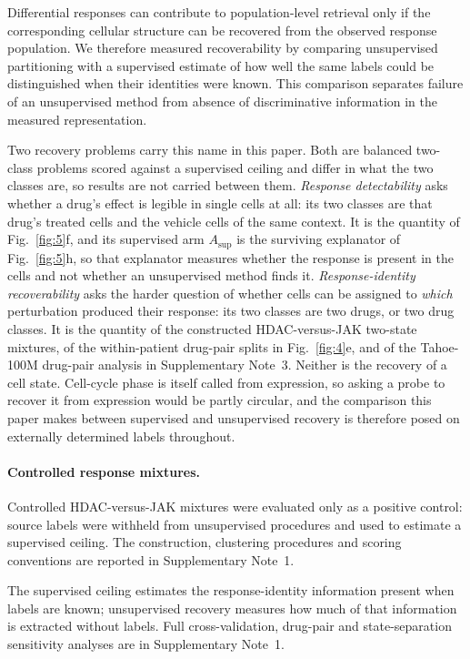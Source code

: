 \documentclass[11pt,letterpaper]{article}
\begin{document}
Differential responses can contribute to population-level retrieval only if the corresponding
cellular structure can be recovered from the observed response population. We therefore measured
recoverability by comparing unsupervised partitioning with a supervised estimate of how well the
same labels could be distinguished when their identities were known. This comparison separates
failure of an unsupervised method from absence of discriminative information in the measured
representation.

Two recovery problems carry this name in this paper. Both are balanced two-class problems scored
against a supervised ceiling and differ in what the two classes are, so results are not carried
between them. \emph{Response detectability} asks whether a drug's effect is legible in single cells at all:
its two classes are that drug's treated cells and the vehicle cells of the same context. It is the
quantity of Fig.~\ref{fig:5}f, and its supervised arm $A_{\mathrm{sup}}$ is the surviving explanator
of Fig.~\ref{fig:5}h, so that explanator measures whether the response is present in the cells and
not whether an unsupervised method finds it.
\emph{Response-identity recoverability} asks the harder question of whether cells can be assigned
to \emph{which} perturbation produced their response: its two classes are two drugs, or two drug
classes. It is the quantity of the constructed HDAC-versus-JAK two-state mixtures, of the
within-patient drug-pair splits in Fig.~\ref{fig:4}e, and of the Tahoe-100M drug-pair analysis in
Supplementary Note~3. Neither is the recovery of a cell state. Cell-cycle phase is itself called
from expression, so asking a probe to recover it from expression would be partly circular, and the
comparison this paper makes between supervised and unsupervised recovery is therefore posed on
externally determined labels throughout.

\paragraph{Controlled response mixtures.}
Controlled HDAC-versus-JAK mixtures were evaluated only as a positive control: source labels were
withheld from unsupervised procedures and used to estimate a supervised ceiling. The construction,
clustering procedures and scoring conventions are reported in Supplementary Note~1.

The supervised ceiling estimates the response-identity information present when labels are known;
unsupervised recovery measures how much of that information is extracted without labels. Full
cross-validation, drug-pair and state-separation sensitivity analyses are in Supplementary Note~1.
\end{document}
